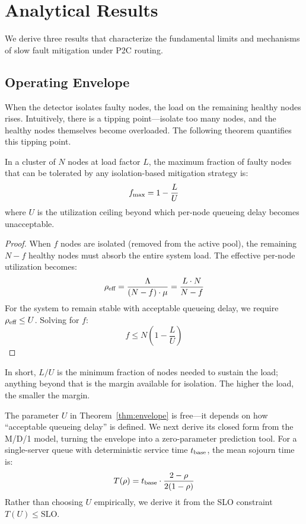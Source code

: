 \section{Analytical Results}
\label{sec:analysis}

We derive three results that characterize the fundamental limits and
mechanisms of slow fault mitigation under P2C routing.

\subsection{Operating Envelope}
\label{sec:envelope}

When the detector isolates faulty nodes, the load on the remaining
healthy nodes rises. Intuitively, there is a tipping point---isolate
too many nodes, and the healthy nodes themselves become overloaded.
The following theorem quantifies this tipping point.

\begin{theorem}
\label{thm:envelope}
In a cluster of $N$ nodes at load factor $L$, the maximum fraction of
faulty nodes that can be tolerated by any isolation-based mitigation
strategy is:
\begin{equation}
  f_{\max} = 1 - \frac{L}{U}
\end{equation}
where $U$ is the utilization ceiling beyond which per-node queueing
delay becomes unacceptable.
\end{theorem}

\begin{proof}
When $f$ nodes are isolated (removed from the active pool), the
remaining $N - f$ healthy nodes must absorb the entire system load. The
effective per-node utilization becomes:
\begin{equation}
  \rho_{\text{eff}} = \frac{\Lambda}{(N-f) \cdot \mu} = \frac{L \cdot N}{N - f}
\end{equation}
For the system to remain stable with acceptable queueing delay, we
require $\rho_{\text{eff}} \leq U$. Solving for $f$:
\begin{equation}
  f \leq N \left(1 - \frac{L}{U}\right)
\end{equation}
\end{proof}

In short, $L/U$ is the minimum fraction of nodes needed to sustain the
load; anything beyond that is the margin available for isolation.
The higher the load, the smaller the margin.

\medskip

The parameter $U$ in Theorem~\ref{thm:envelope} is free---it depends
on how ``acceptable queueing delay'' is defined. We next derive its
closed form from the M/D/1 model, turning the envelope into a
zero-parameter prediction tool.
For a single-server queue with deterministic service time $t_{\text{base}}$,
the mean sojourn time is:
\begin{equation}
  T(\rho) = t_{\text{base}} \cdot \frac{2 - \rho}{2(1 - \rho)}
  \label{eq:md1}
\end{equation}
Rather than choosing $U$ empirically, we derive it from the SLO
constraint $T(U) \leq \text{SLO}$.

